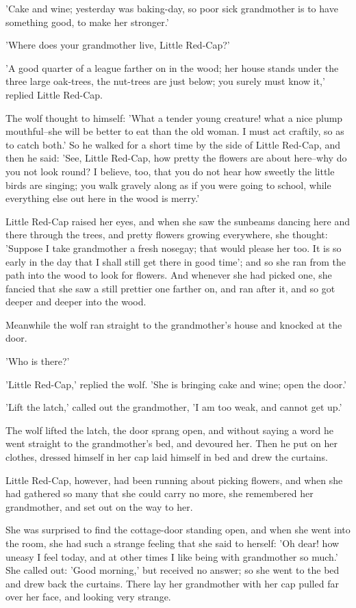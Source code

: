 \documentclass[12pt]{book}
\begin{document}
'Cake and wine; yesterday was baking-day, so poor sick grandmother is
to have something good, to make her stronger.'

'Where does your grandmother live, Little Red-Cap?'

'A good quarter of a league farther on in the wood; her house stands
under the three large oak-trees, the nut-trees are just below; you
surely must know it,' replied Little Red-Cap.

The wolf thought to himself: 'What a tender young creature! what a
nice plump mouthful--she will be better to eat than the old woman. I
must act craftily, so as to catch both.' So he walked for a short time
by the side of Little Red-Cap, and then he said: 'See, Little Red-Cap,
how pretty the flowers are about here--why do you not look round? I
believe, too, that you do not hear how sweetly the little birds are
singing; you walk gravely along as if you were going to school, while
everything else out here in the wood is merry.'

Little Red-Cap raised her eyes, and when she saw the sunbeams dancing
here and there through the trees, and pretty flowers growing
everywhere, she thought: 'Suppose I take grandmother a fresh nosegay;
that would please her too. It is so early in the day that I shall
still get there in good time'; and so she ran from the path into the
wood to look for flowers. And whenever she had picked one, she fancied
that she saw a still prettier one farther on, and ran after it, and so
got deeper and deeper into the wood.

Meanwhile the wolf ran straight to the grandmother's house and knocked
at the door.

'Who is there?'

'Little Red-Cap,' replied the wolf. 'She is bringing cake and wine;
open the door.'

'Lift the latch,' called out the grandmother, 'I am too weak, and
cannot get up.'

The wolf lifted the latch, the door sprang open, and without saying a
word he went straight to the grandmother's bed, and devoured her. Then
he put on her clothes, dressed himself in her cap laid himself in bed
and drew the curtains.

Little Red-Cap, however, had been running about picking flowers, and
when she had gathered so many that she could carry no more, she
remembered her grandmother, and set out on the way to her.

She was surprised to find the cottage-door standing open, and when she
went into the room, she had such a strange feeling that she said to
herself: 'Oh dear! how uneasy I feel today, and at other times I like
being with grandmother so much.' She called out: 'Good morning,' but
received no answer; so she went to the bed and drew back the curtains.
There lay her grandmother with her cap pulled far over her face, and
looking very strange.
\end{document}

